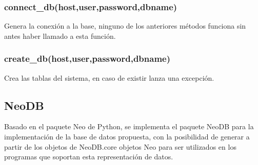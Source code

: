 \documentclass[12pt]{article}
\numberwithin{equation}{section}
\numberwithin{figure}{section}
\numberwithin{table}{section}
\begin{document}
\subsubsection*{connect\_db(host,user,password,dbname)}
Genera la conexión a la base, ninguno de los anteriores métodos funciona sin antes haber llamado a esta función.

\subsubsection*{create\_db(host,user,password,dbname)}
Crea las tablas del sistema, en caso de existir lanza una excepción.


\subsection*{NeoDB}
Basado en el paquete Neo de Python, se implementa el paquete NeoDB para la implementación de la base de datos propuesta, con la posibilidad de generar a partir de los objetos de NeoDB.core objetos Neo para ser utilizados en los programas que soportan esta representación de datos.
\end{document}
